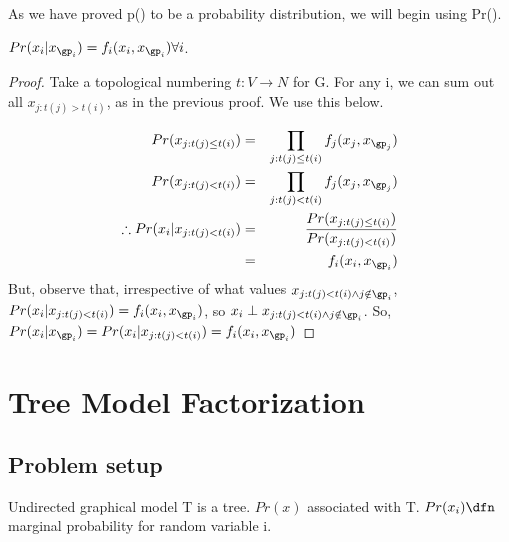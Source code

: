 \documentclass{article}
\begin{document}
\begin{notation}
As we have proved p() to be a probability distribution, we will begin using Pr().
\end{notation}


\begin{lem}
$Pr(x_i|x_{\gp_i}) = f_i(x_i, x_{\gp_i}) \forall i$.
\end{lem}
\begin{proof}
Take a topological numbering $t:V \to N$ for G. For any i, we can sum out all $x_{j: t(j)> t(i)}$, as in the previous proof. We use this below.

\begin{eqnarray*}
Pr(x_{j:t(j) \leq t(i)}) &=& \prod_{j: t(j) \leq t(i)} f_j(x_j, x_{\gp_j})\\
Pr(x_{j:t(j) < t(i)}) &=& \prod_{j: t(j) < t(i)} f_j(x_j, x_{\gp_j})\\
\therefore Pr(x_i|x_{j:t(j) < t(i)}) &=& \frac{Pr(x_{j:t(j) \leq t(i)})}{Pr(x_{j:t(j) < t(i)})}\\
&=& f_i(x_i, x_{\gp_i})\\
\end{eqnarray*}
But, observe that, irrespective of what values $x_{j:t(j) < t(i) \land j \notin \gp_i}$, \\
$Pr(x_i|x_{j:t(j) < t(i)}) = f_i(x_i, x_{\gp_i})$, so $x_i \perp x_{j:t(j) < t(i) \land j \notin \gp_i}$. So, $Pr(x_i|x_{\gp_i}) = Pr(x_i|x_{j:t(j) < t(i)}) = f_i(x_i, x_{\gp_i})$
\end{proof}


\section{Tree Model Factorization}
\subsection{Problem setup}
Undirected graphical model T is a tree. $Pr(x)$ associated with T. $Pr(x_i) \dfn$ marginal probability for random variable i.
\end{document}
